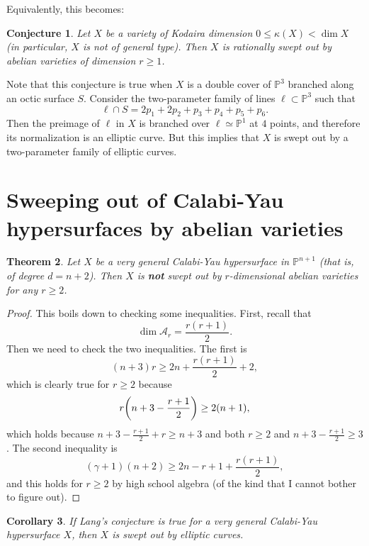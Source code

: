 \documentclass[leqno, openany]{memoir}
\newtheorem{thm}{Theorem}[section]
\newtheorem{cor}[thm]{Corollary}
\newtheorem{conj}[thm]{Conjecture}
\theoremstyle{definition}
\theoremstyle{remark}
\theoremstyle{plain}
\theoremstyle{definition}
\theoremstyle{remark}
\renewcommand{\P}{\mathbb{P}}
\newcommand{\mc}[1]{\mathcal{#1}}
\begin{document}
Equivalently, this becomes:

\begin{conj}
    Let $X$ be a variety of Kodaira dimension $0 \leq \kappa(X) < \dim X$ (in particular, $X$ is not of general type). Then $X$ is rationally swept out by abelian varieties of dimension $r \geq 1$.
\end{conj}

Note that this conjecture is true when $X$ is a double cover of $\P^3$ branched along an octic surface $S$. Consider the two-parameter family of lines $\ell \subset \P^3$ such that
\[ \ell \cap S = 2 p_1 + 2 p_2 + p_3 + p_4 + p_5 + p_6. \]
Then the preimage of $\ell$ in $X$ is branched over $\ell \simeq \P^1$ at $4$ points, and therefore its normalization is an elliptic curve. But this implies that $X$ is swept out by a two-parameter family of elliptic curves.

\section{Sweeping out of Calabi-Yau hypersurfaces by abelian varieties}

\begin{thm}
    Let $X$ be a very general Calabi-Yau hypersurface in $\P^{n+1}$ (that is, of degree $d = n+2$). Then $X$ is \textbf{not} swept out by $r$-dimensional abelian varieties for any $r \geq 2$.
\end{thm}

\begin{proof}
    This boils down to checking some inequalities. First, recall that
    \[ \dim \mc{A}_r = \frac{r(r+1)}{2}. \]
    Then we need to check the two inequalities. The first is
    \[ (n+3)r \geq 2n + \frac{r(r+1)}{2} + 2, \]
    which is clearly true for $r \geq 2$ because
    \begin{align*}
        r\qty(n+3-\frac{r+1}{2}) \geq 2(n+1),
    \end{align*}
    which holds because $n + 3 - \frac{r+1}{2} + r \geq n+3$ and both $r \geq 2$ and $n+3-\frac{r+1}{2} \geq 3$. The second inequality is
    \[ (\gamma + 1)(n+2) \geq 2n - r + 1 + \frac{r(r+1)}{2}, \]
    and this holds for $r \geq 2$ by high school algebra (of the kind that I cannot bother to figure out).
\end{proof}

\begin{cor}
    If Lang's conjecture is true for a very general Calabi-Yau hypersurface $X$, then $X$ is swept out by elliptic curves.
\end{cor}
\end{document}
